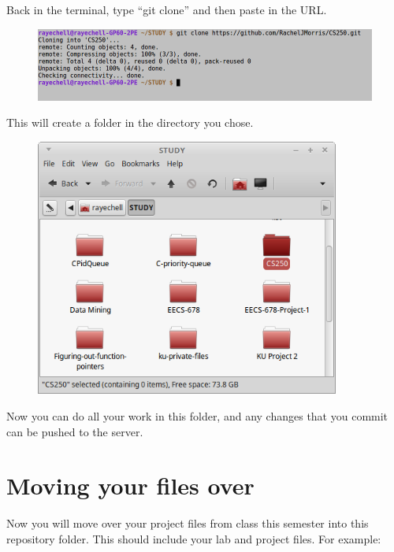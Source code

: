 \documentclass[a4paper,12pt,oneside]{book}
\begin{document}
            Back in the terminal, type ``git clone'' and then paste
            in the URL.

                \begin{figure}[h]
                    \centering
                    \includegraphics[width=14cm]{images/git-cl-clone.png}
                \end{figure}

            This will create a folder in the directory you chose.

            \newpage

                \begin{figure}[h]
                    \centering
                    \includegraphics[width=10cm]{images/git-directory.png}
                \end{figure}

            Now you can do all your work in this folder, and any changes
            that you commit can be pushed to the server.

    \newpage

    \section{Moving your files over}
    
        Now you will move over your project files from class this semester
        into this repository folder. This should include your lab and project
        files. For example:
\end{document}
